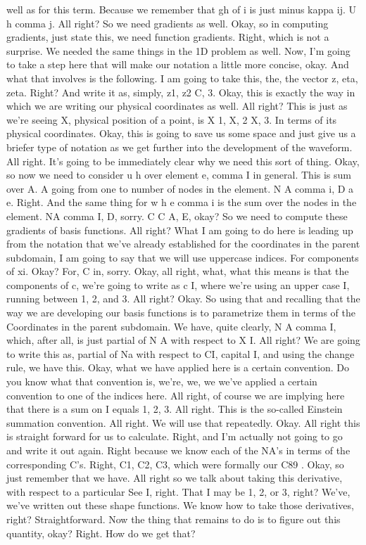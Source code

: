 \documentclass[10pt]{article}
\begin{document}
well as for this term. Because we remember that gh of i is just minus kappa ij. U h comma j. All right? So we need gradients as well. Okay, so in computing gradients, just state this, we need function gradients. Right, which is not a surprise. We needed the same things in the 1D problem as well. Now, I'm going to take a step here that will make our notation a little more concise, okay. And what that involves is the following. I am going to take this, the, the vector z, eta, zeta. Right? And write it as, simply, z1, z2 C, 3. Okay, this is exactly the way in which we are writing our physical coordinates as well. All right? This is just as we're seeing X, physical position of a point, is X 1, X, 2 X, 3. In terms of its physical coordinates. Okay, this is going to save us some space and just give us a briefer type of notation as we get further into the development of the waveform. All right. It's going to be immediately clear why we need this sort of thing. Okay, so now we need to consider u h over element e, comma I in general. This is sum over A. A going from one to number of nodes in the element. N A comma i, D a e. Right. And the same thing for w h e comma i is the sum over the nodes in the element. NA comma I, D, sorry. C C A, E, okay? So we need to compute these gradients of basis functions. All right? What I am going to do here is leading up from the notation that we've already established for the coordinates in the parent subdomain, I am going to say that we will use uppercase indices. For components of xi. Okay? For, C in, sorry. Okay, all right, what, what this means is that the components of c, we're going to write as c I, where we're using an upper case I, running between 1, 2, and 3. All right? Okay. So using that and recalling that the way we are developing our basis functions is to parametrize them in terms of the Coordinates in the parent subdomain. We have, quite clearly, N A comma I, which, after all, is just partial of N A with respect to X I. All right? We are going to write this as, partial of Na with respect to CI, capital I, and using the change rule, we have this. Okay, what we have applied here is a certain convention. Do you know what that convention is, we're, we, we we've applied a certain convention to one of the indices here. All right, of course we are implying here that there is a sum on I equals 1, 2, 3. All right. This is the so-called Einstein summation convention. All right. We will use that repeatedly. Okay. All right this is straight forward for us to calculate. Right, and I'm actually not going to go and write it out again. Right because we know each of the NA's in terms of the corresponding C's. Right, C1, C2, C3, which were formally our C89 . Okay, so just remember that we have. All right so we talk about taking this derivative, with respect to a particular See I, right. That I may be 1, 2, or 3, right? We've, we've written out these shape functions. We know how to take those derivatives, right? Straightforward. Now the thing that remains to do is to figure out this quantity, okay? Right. How do we get that?
\end{document}
